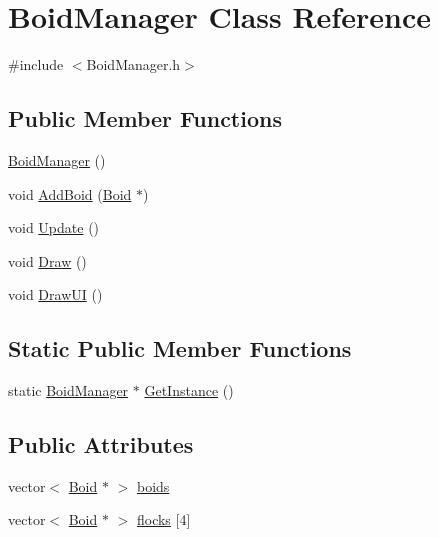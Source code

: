 \hypertarget{class_boid_manager}{}\section{Boid\+Manager Class Reference}
\label{class_boid_manager}


{\ttfamily \#include $<$Boid\+Manager.\+h$>$}

\subsection*{Public Member Functions}
\begin{DoxyCompactItemize}
\item 
\hyperlink{class_boid_manager_a605e34b9275cbd7d0c00ed65d771b23e}{Boid\+Manager} ()
\item 
void \hyperlink{class_boid_manager_a072752bb16c5ede0155932c40eef1db7}{Add\+Boid} (\hyperlink{class_boid}{Boid} $\ast$)
\item 
void \hyperlink{class_boid_manager_a45aa4d3cdbe39b30b1c42e028b0fff9f}{Update} ()
\item 
void \hyperlink{class_boid_manager_ad3646a44a8e0f8970d3a5925c63f78f5}{Draw} ()
\item 
void \hyperlink{class_boid_manager_a35d2ffedc1bf85259592e3047e014f9e}{Draw\+UI} ()
\end{DoxyCompactItemize}
\subsection*{Static Public Member Functions}
\begin{DoxyCompactItemize}
\item 
static \hyperlink{class_boid_manager}{Boid\+Manager} $\ast$ \hyperlink{class_boid_manager_a05908f2393277c384066d35703de6c89}{Get\+Instance} ()
\end{DoxyCompactItemize}
\subsection*{Public Attributes}
\begin{DoxyCompactItemize}
\item 
vector$<$ \hyperlink{class_boid}{Boid} $\ast$ $>$ \hyperlink{class_boid_manager_a7e2b1c2dfced5cb8f36255742afa6e83}{boids}
\item 
vector$<$ \hyperlink{class_boid}{Boid} $\ast$ $>$ \hyperlink{class_boid_manager_aa4c01eee1d357cb75db650bb1c63bf60}{flocks} \mbox{[}4\mbox{]}
\end{DoxyCompactItemize}


